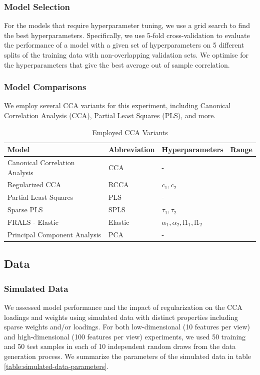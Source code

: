 \subsubsection{Model Selection}

For the models that require hyperparameter tuning, we use a grid search to find the best hyperparameters.
Specifically, we use 5-fold cross-validation to evaluate the performance of a model with a given set of hyperparameters on 5 different splits of the training data with non-overlapping validation sets.
We optimise for the hyperparameters that give the best average out of sample correlation.

\subsubsection{Model Comparisons}
We employ several CCA variants for this experiment, including Canonical Correlation Analysis (CCA), Partial Least Squares (PLS), and more.

\begin{table}[h]
\centering
\caption{Employed CCA Variants}
\begin{tabular}{|l|l|l|l|}
\hline
\textbf{Model} & \textbf{Abbreviation} & \textbf{Hyperparameters} & \textbf{Range} \\
\hline
Canonical Correlation Analysis & CCA & - &  \\
\hline
Regularized CCA & RCCA & \(c_1, c_2\) &  \\
\hline
Partial Least Squares & PLS & - &  \\
\hline
Sparse PLS & SPLS & \(\tau_1, \tau_2\) &  \\
\hline
FRALS - Elastic & Elastic & \(\alpha_1, \alpha_2, \text{l1}_1, \text{l1}_2\) &  \\
\hline
Principal Component Analysis & PCA & - & \\
\hline
\end{tabular}
\label{table:cca-variants}
\end{table}

\subsection{Data}

\subsubsection{Simulated Data}

We assessed model performance and the impact of regularization on the CCA loadings and weights using simulated data with distinct properties including sparse weights and/or loadings.
For both low-dimensional (10 features per view) and high-dimensional (100 features per view) experiments, we used 50 training and 50 test samples in each of 10 independent random draws from the data generation process.
We summarize the parameters of the simulated data in table \ref{table:simulated-data-parameters}.

